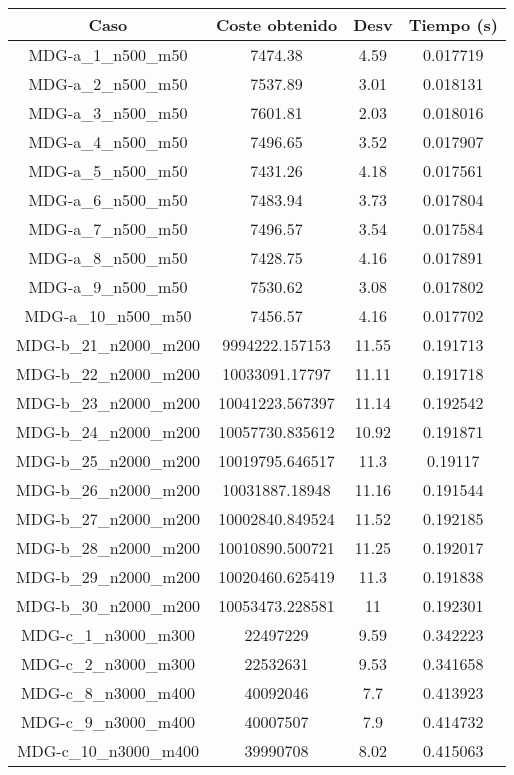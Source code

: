 \documentclass{article}
\begin{document}
\begin{table}[H]
	\centering
	\begin{tabular}{|cccc|}
		\hline
		Caso & Coste obtenido & Desv & Tiempo (s)\\ \hline
		MDG-a\_1\_n500\_m50 & 7474.38 & 4.59 & 0.017719\\
		MDG-a\_2\_n500\_m50 & 7537.89 & 3.01 & 0.018131\\
		MDG-a\_3\_n500\_m50 & 7601.81 & 2.03 & 0.018016\\
		MDG-a\_4\_n500\_m50 & 7496.65 & 3.52 & 0.017907\\
		MDG-a\_5\_n500\_m50 & 7431.26 & 4.18 & 0.017561\\
		MDG-a\_6\_n500\_m50 & 7483.94 & 3.73 & 0.017804\\
		MDG-a\_7\_n500\_m50 & 7496.57 & 3.54 & 0.017584\\
		MDG-a\_8\_n500\_m50 & 7428.75 & 4.16 & 0.017891\\
		MDG-a\_9\_n500\_m50 & 7530.62 & 3.08 & 0.017802\\
		MDG-a\_10\_n500\_m50 & 7456.57 & 4.16 & 0.017702\\
		MDG-b\_21\_n2000\_m200 & 9994222.157153 & 11.55 & 0.191713\\
		MDG-b\_22\_n2000\_m200 & 10033091.17797 & 11.11 & 0.191718\\
		MDG-b\_23\_n2000\_m200 & 10041223.567397 & 11.14 & 0.192542\\
		MDG-b\_24\_n2000\_m200 & 10057730.835612 & 10.92 & 0.191871\\
		MDG-b\_25\_n2000\_m200 & 10019795.646517 & 11.3 & 0.19117\\
		MDG-b\_26\_n2000\_m200 & 10031887.18948 & 11.16 & 0.191544\\
		MDG-b\_27\_n2000\_m200 & 10002840.849524 & 11.52 & 0.192185\\
		MDG-b\_28\_n2000\_m200 & 10010890.500721 & 11.25 & 0.192017\\
		MDG-b\_29\_n2000\_m200 & 10020460.625419 & 11.3 & 0.191838\\
		MDG-b\_30\_n2000\_m200 & 10053473.228581 & 11 & 0.192301\\
		MDG-c\_1\_n3000\_m300 & 22497229 & 9.59 & 0.342223\\
		MDG-c\_2\_n3000\_m300 & 22532631 & 9.53 & 0.341658\\
		MDG-c\_8\_n3000\_m400 & 40092046 & 7.7 & 0.413923\\
		MDG-c\_9\_n3000\_m400 & 40007507 & 7.9 & 0.414732\\
		MDG-c\_10\_n3000\_m400 & 39990708 & 8.02 & 0.415063\\

\end{tabular}
\end{table}
\end{document}
